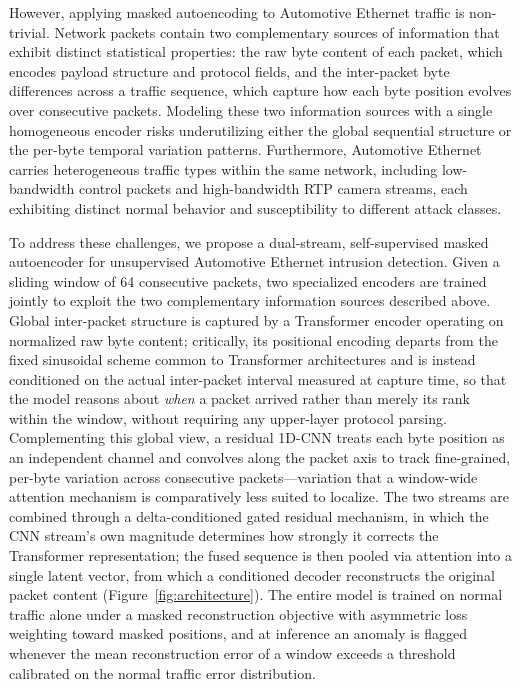 However, applying masked autoencoding to Automotive Ethernet traffic is non-trivial. Network packets contain two complementary sources of information that exhibit distinct statistical properties: the raw byte content of each packet, which encodes payload structure and protocol fields, and the inter-packet byte differences across a traffic sequence, which capture how each byte position evolves over consecutive packets. Modeling these two information sources with a single homogeneous encoder risks underutilizing either the global sequential structure or the per-byte temporal variation patterns. Furthermore, Automotive Ethernet carries heterogeneous traffic types within the same network, including low-bandwidth control packets and high-bandwidth RTP camera streams, each exhibiting distinct normal behavior and susceptibility to different attack classes.

To address these challenges, we propose a dual-stream, self-supervised masked autoencoder for unsupervised Automotive Ethernet intrusion detection. Given a sliding window of 64 consecutive packets, two specialized encoders are trained jointly to exploit the two complementary information sources described above. Global inter-packet structure is captured by a Transformer encoder operating on normalized raw byte content; critically, its positional encoding departs from the fixed sinusoidal scheme common to Transformer architectures and is instead conditioned on the actual inter-packet interval measured at capture time, so that the model reasons about \emph{when} a packet arrived rather than merely its rank within the window, without requiring any upper-layer protocol parsing. Complementing this global view, a residual 1D-CNN treats each byte position as an independent channel and convolves along the packet axis to track fine-grained, per-byte variation across consecutive packets---variation that a window-wide attention mechanism is comparatively less suited to localize. The two streams are combined through a delta-conditioned gated residual mechanism, in which the CNN stream's own magnitude determines how strongly it corrects the Transformer representation; the fused sequence is then pooled via attention into a single latent vector, from which a conditioned decoder reconstructs the original packet content (Figure~\ref{fig:architecture}). The entire model is trained on normal traffic alone under a masked reconstruction objective with asymmetric loss weighting toward masked positions, and at inference an anomaly is flagged whenever the mean reconstruction error of a window exceeds a threshold calibrated on the normal traffic error distribution.

